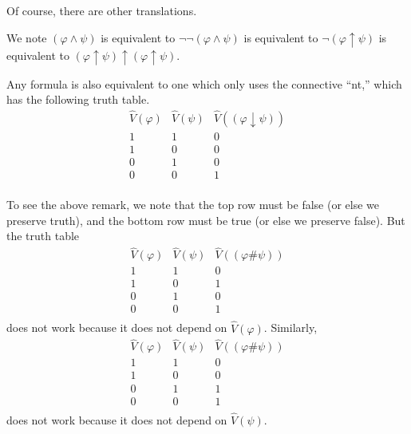 Of course, there are other translations.
\begin{example}
	We note $(\varphi\land\psi)$ is equivalent to $\lnot\lnot(\varphi\land\psi)$ is equivalent to $\lnot(\varphi\uparrow\psi)$ is equivalent to $(\varphi\uparrow\psi)\uparrow(\varphi\uparrow\psi)$.
\end{example}
\begin{remark}
	Any formula is also equivalent to one which only uses the connective ``nt,'' which has the following truth table.
	\[\begin{array}{c|c||c}
		\hat V(\varphi) & \hat V(\psi) & \hat V((\varphi\downarrow\psi)) \\
		\hline
		1 & 1 & 0 \\
		1 & 0 & 0 \\
		0 & 1 & 0 \\
		0 & 0 & 1 \\
	\end{array}\]
\end{remark}
To see the above remark, we note that the top row must be false (or else we preserve truth), and the bottom row must be true (or else we preserve false). But the truth table
\[\begin{array}{c|c||c}
	\hat V(\varphi) & \hat V(\psi) & \hat V((\varphi\#\psi)) \\
	\hline
	1 & 1 & 0 \\
	1 & 0 & 1 \\
	0 & 1 & 0 \\
	0 & 0 & 1 \\
\end{array}\]
does not work because it does not depend on $\hat V(\varphi)$. Similarly,
\[\begin{array}{c|c||c}
	\hat V(\varphi) & \hat V(\psi) & \hat V((\varphi\#\psi)) \\
	\hline
	1 & 1 & 0 \\
	1 & 0 & 0 \\
	0 & 1 & 1 \\
	0 & 0 & 1 \\
\end{array}\]
does not work because it does not depend on $\hat V(\psi)$.

